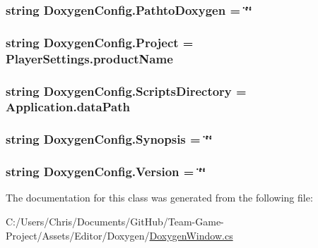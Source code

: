 \subsubsection[{\texorpdfstring{Pathto\+Doxygen}{PathtoDoxygen}}]{\setlength{\rightskip}{0pt plus 5cm}string Doxygen\+Config.\+Pathto\+Doxygen = \char`\"{}\char`\"{}}\hypertarget{class_doxygen_config_ad308ed1d0bdb202587fba232b754929f}{}\label{class_doxygen_config_ad308ed1d0bdb202587fba232b754929f}
\subsubsection[{\texorpdfstring{Project}{Project}}]{\setlength{\rightskip}{0pt plus 5cm}string Doxygen\+Config.\+Project = Player\+Settings.\+product\+Name}\hypertarget{class_doxygen_config_ae69318495ba1db9f3a4d88e01764f9b4}{}\label{class_doxygen_config_ae69318495ba1db9f3a4d88e01764f9b4}
\subsubsection[{\texorpdfstring{Scripts\+Directory}{ScriptsDirectory}}]{\setlength{\rightskip}{0pt plus 5cm}string Doxygen\+Config.\+Scripts\+Directory = Application.\+data\+Path}\hypertarget{class_doxygen_config_aea53b2e7fc0f47a7f658ce25e65c4a09}{}\label{class_doxygen_config_aea53b2e7fc0f47a7f658ce25e65c4a09}
\subsubsection[{\texorpdfstring{Synopsis}{Synopsis}}]{\setlength{\rightskip}{0pt plus 5cm}string Doxygen\+Config.\+Synopsis = \char`\"{}\char`\"{}}\hypertarget{class_doxygen_config_a2b1926144ba2768c36de32a8d3445567}{}\label{class_doxygen_config_a2b1926144ba2768c36de32a8d3445567}
\subsubsection[{\texorpdfstring{Version}{Version}}]{\setlength{\rightskip}{0pt plus 5cm}string Doxygen\+Config.\+Version = \char`\"{}\char`\"{}}\hypertarget{class_doxygen_config_af72cbcc553de9766a100f77f90c35626}{}\label{class_doxygen_config_af72cbcc553de9766a100f77f90c35626}


The documentation for this class was generated from the following file\+:\begin{DoxyCompactItemize}
\item 
C\+:/\+Users/\+Chris/\+Documents/\+Git\+Hub/\+Team-\/\+Game-\/\+Project/\+Assets/\+Editor/\+Doxygen/\hyperlink{_doxygen_window_8cs}{Doxygen\+Window.\+cs}\end{DoxyCompactItemize}
